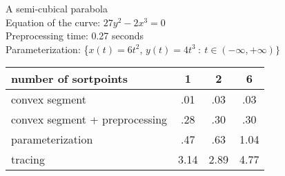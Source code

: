 \clearpage
%
\begin{example}
A semi-cubical parabola\\
Equation of the curve: $27 y^{2} - 2x^{3} = 0$\\
Preprocessing time: 0.27 seconds\\
Parameterization: \{$x(t) = 6t^{2}$,\vspace{.5in} $y(t) = 4t^{3}\ :\ 
t \in (-\infty, +\infty) \}$\\
%
\begin{tabular}{|l|c|c|c|}  \hline
number of sortpoints & 1 & 2 & 6 \\ \hline \hline
convex segment &           .01 & .03 & .03 \\ \hline
convex segment + preprocessing & .28 & .30 & .30 \\ \hline
parameterization & .47 & .63 & 1.04 \\ \hline
tracing         & 3.14 & 2.89 & 4.77 \\ \hline
\end{tabular}
\end{example}


\vspace{.2in}

